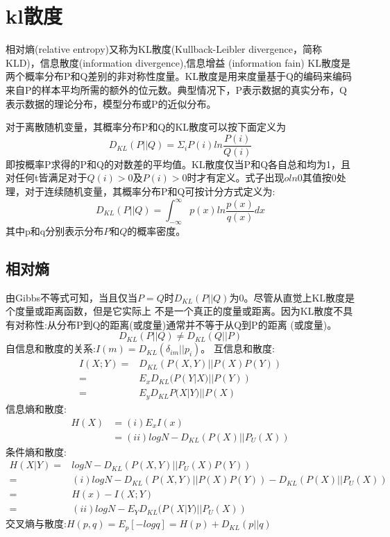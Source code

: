 \section{kl散度}
相对熵(relative entropy)又称为KL散度(Kullback-Leibler divergence，简称KLD)，信息散度(information divergence),信息增益
(information fain)
KL散度是两个概率分布P和Q差别的非对称性度量。KL散度是用来度量基于Q的编码来编码来自P的样本平均所需的额外的位元数。典型情况下，P表示数据的真实分布，Q表示数据的理论分布，模型分布或P的近似分布。

对于离散随机变量，其概率分布P和Q的KL散度可以按下面定义为
\begin{equation}
D_{KL}(P||Q)=\Sigma_iP(i)ln\frac{P(i)}{Q(i)}
\end{equation}
即按概率P求得的P和Q的对数差的平均值。KL散度仅当P和Q各自总和均为1，且对任何t皆满足对于$Q(i)>0$及$P(i)>0$时才有定义。式子出现$oln0$其值按0处理，对于连续随机变量，其概率分布P和Q可按计分方式定义为:
\begin{equation}
D_{KL}(P||Q)=\int_{-\infty}^{\infty}p(x)ln\frac{p(x)}{q(x)}dx
\end{equation}
其中p和q分别表示分布$P$和$Q$的概率密度。
\subsection{相对熵}
由Gibbs不等式可知，当且仅当$P=Q$时$D_{KL}(P||Q)$为0。尽管从直觉上KL散度是个度量或距离函数，但是它实际上
不是一个真正的度量或距离。因为KL散度不具有对称性:从分布P到Q的距离(或度量)通常并不等于从Q到P的距离
(或度量)。
\[D_{KL}(P||Q)\neq D_{KL}(Q||P)\]
自信息和散度的关系:$I(m)=D_{KL}(\delta_{im}||{p_i})$。
互信息和散度:
\begin{align*}
I(X;Y)=&D_{KL}(P(X,Y)||P(X)P(Y))\\
      =&E_x{D_{KL}(P(Y|X)||P(Y))}\\
      =&E_y{D_{KL}P(X|Y)||P(X)}
\end{align*}
信息熵和散度:
\begin{align*}
H(X)&=(i)E_x{I(x)}\\
    &=(ii)logN-D_{KL}(P(X)||P_U(X))
\end{align*}
条件熵和散度:
\begin{align*}
H(X|Y)=&logN-D_{KL}(P(X,Y)||P_U(X)P(Y))\\
      =&(i)logN-D_{KL}(P(X,Y)||P(X)P(Y))-D_{KL}(P(X)||P_U(X))\\
      =&H(x)-I(X;Y)\\
      =&(ii)logN-E_Y{D_{KL}(P(X|Y)||P_U(X))} 
\end{align*}
交叉熵与散度:$H(p,q)=E_p[-logq]=H(p)+D_{KL}(p||q)$